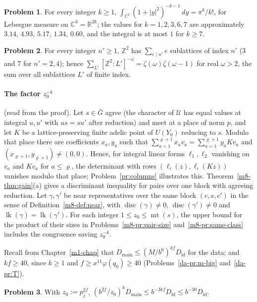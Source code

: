 \documentclass[reqno]{amsart}
\newcounter{chap}
\theoremstyle{definition}
\newtheorem{problem}{Problem}[section]
\theoremstyle{plain}
\theoremstyle{remark}
\newcommand{\Z}{{\mathbb{Z}}}
\newcommand{\C}{{\mathbb{C}}}
\newcommand{\Uc}{{\mathcal{U}}}
\newcommand{\Gb}{\bar G}
\newcommand{\Did}{D_{\mathrm{id}}}
\newcommand{\Dmain}{D_{\mathrm{main}}}
\newcommand{\disc}{\operatorname{disc}}
\newcommand{\lk}{\operatorname{lk}}
\newcommand{\mt}{\operatorname{mt}}
\begin{document}
\begin{problem}\label{pr:hua}
For every integer \(k\ge1\), \(\int_{\C^k}(1+\lvert y\rvert^2)^{-k-1}\,dy=\pi^k/k!\), for Lebesgue measure on \(\C^k=\mathbb R^{2k}\); the values for \(k=1,2,3,6,7\) are approximately \(3.14\), \(4.93\), \(5.17\), \(1.34\), \(0.60\), and the integral is at most \(1\) for \(k\ge7\).
\end{problem}

\begin{problem}\label{pr:sublattices}
For every integer \(n'\ge1\), \(\Z^2\) has \(\sum_{e\mid n'}e\) sublattices of index \(n'\) (\(3\) and \(7\) for \(n'=2,4\)); hence \(\sum_{L'}[\Z^2:L']^{-\omega}=\zeta(\omega)\zeta(\omega-1)\) for real \(\omega>2\), the sum over all sublattices \(L'\) of finite index.
\end{problem}

\paragraph{The factor \(z_0^{-k}\)} (read from the proof).  Let \(s\in\Gb\) agree (the character of \(\Uc\) has equal values at integral \(u,u'\) with \(us=su'\) after reduction) and meet at a place of norm \(p\), and let \(K\) be a lattice-preserving finite adelic point of \(U(Y_0)\) reducing to \(s\).  Modulo that place there are coefficients \(x_a,y_a\) such that \(\sum_{a=1}^{\varrho+1}x_av_a=\sum_{a=1}^{\varrho+1}y_aKv_a\) and \((x_{\varrho+1},y_{\varrho+1})\ne(0,0)\).  Hence, for integral linear forms \(\ell_1,\ell_2\) vanishing on \(v_a\) and \(Kv_a\) for \(a\le\varrho\), the determinant with rows \((\ell_i(z),\ell_i(Kz))\) vanishes modulo that place; Problem~\ref{pr:columns} illustrates this.  Theorem~\ref{m8-thm:gain}(a) gives a discriminant inequality for pairs over one block with agreeing reduction.  Let \(\gamma,\gamma'\) be near representatives over the same block \((c,s,c')\) in the sense of Definition~\ref{m8-def:near}, with \(\disc(\gamma)\ne0\), \(\disc(\gamma')\ne0\) and \(\lk(\gamma)=\lk(\gamma')\).  For each integer \(1\le z_0\le\mt(s)\), the upper bound for the product of their sizes in Problems~\ref{m8-pr:pair-size} and~\ref{m8-pr:same-class} includes the congruence saving \(z_0^{-k}\).

Recall from Chapter~\ref{m1-chap} that \(\Dmain\le(M/b^6)^{kf}\Did\) for the data; and \(kf\ge40\), since \(k\ge1\) and \(f\ge x^{11}\varphi(q_0)\ge40\) (Problems~\ref{da-pr:m-big} and~\ref{da-pr:T}).

\begin{problem}\label{pr:exponent}
With \(z_0:=p_j^{2f}\), \((b^{2f}/z_0)^k\Dmain\le b^{-3kf}\Did\le b^{-30}\Did\).
\end{problem}
\end{document}
